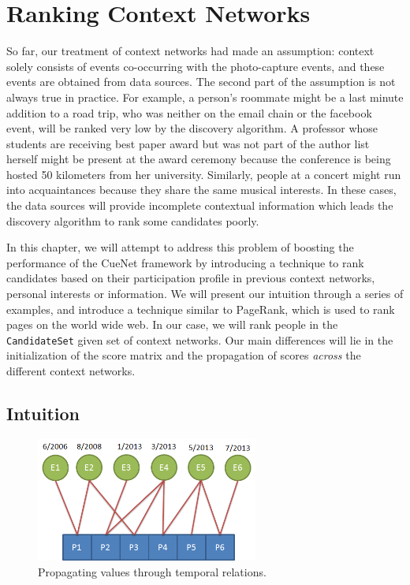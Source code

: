 \chapter{Ranking Context Networks}

So far, our treatment of context networks had made an assumption: context solely consists of events co-occurring with the photo-capture events, and these events are obtained from data sources. The second part of the assumption is not always true in practice. For example, a person's roommate might be a last minute addition to a road trip, who was neither on the email chain or the facebook event, will be ranked very low by the discovery algorithm. A professor whose students are receiving best paper award but was not part of the author list herself might be present at the award ceremony because the conference is being hosted 50 kilometers from her university. Similarly, people at a concert might run into acquaintances because they share the same musical interests. In these cases, the data sources will provide incomplete contextual information which leads the discovery algorithm to rank some candidates poorly.

In this chapter, we will attempt to address this problem of boosting the performance of the CueNet framework by introducing a technique to rank candidates based on their participation profile in previous context networks, personal interests or information. We will present our intuition through a series of examples, and introduce a technique similar to PageRank, which is used to rank pages on the world wide web. In our case, we will rank people in the \texttt{CandidateSet} given set of context networks. Our main differences will lie in the initialization of the score matrix and the propagation of scores \textit{across} the different context networks.

\section{Intuition}

\begin{figure}[t]
\centering
\includegraphics[width=0.65\textwidth]{media/chapter6/intuition-time-example.png}
\caption{Propagating values through temporal relations.}
\label{fig:time-example}
\end{figure}

